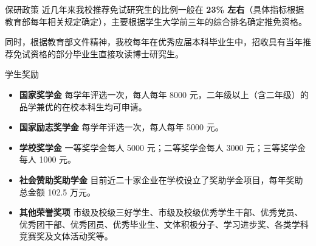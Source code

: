 \documentclass[aspectratio=169, utf8]{beamer}
\begin{document}
\begin{frame}{保研政策}
    近几年来我校推荐免试研究生的比例一般在 \textcolor{Fore}{\textbf{23\% 左右}}（具体指标根据教育部每年相关规定确定），主要根据学生大学前三年的综合排名确定推免资格。

    同时，根据教育部文件精神，我校每年在优秀应届本科毕业生中，招收具有当年推荐免试资格的部分毕业生直接攻读博士研究生。
\end{frame}

\begin{frame}{学生奖励}
    \small
    \begin{itemize}
        \item \textcolor{Fore}{\textbf{国家奖学金}}
              每学年评选一次，每人每年 8000 元，二年级以上（含二年级）的品学兼优的在校本科生均可申请。
        \item \textcolor{Fore}{\textbf{国家励志奖学金}}
              每学年评选一次，每人每年 5000 元。
        \item \textcolor{Fore}{\textbf{学校奖学金}}
              一等奖学金每人 5000 元；二等奖学金每人 3000 元；三等奖学金每人 1000 元。
        \item \textcolor{Fore}{\textbf{社会赞助奖助学金}}
              目前近二十家企业在学校设立了奖助学金项目，每年奖助总金额 102.5 万元。
        \item \textcolor{Fore}{\textbf{其他荣誉奖项}}
              市级及校级三好学生、市级及校级优秀学生干部、优秀党员、优秀团干部、优秀团员、优秀毕业生、文体积极分子、学习进步奖、各类学科竞赛奖及文体活动奖等。
    \end{itemize}
\end{frame}
\end{document}
